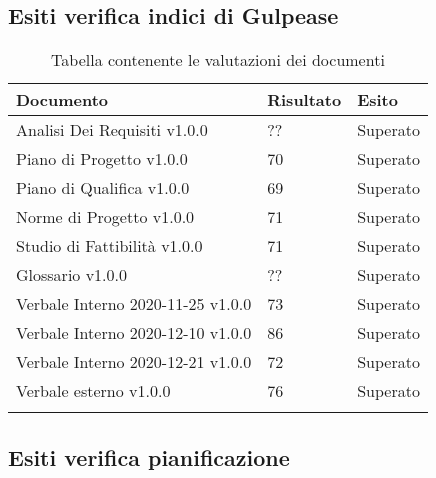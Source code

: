 \documentclass[../piano_di_qualifica.tex]{subfiles}
\begin{document}
\subsection{Esiti verifica indici di Gulpease}
\label{sub:verif_gul}

\begin{center}
	\begin{longtable}{|p{4.5cm}|p{2.5cm}|p{3cm}|}
		\hline
		\rowcolor{lightgray}
            \textbf{Documento} & \textbf{Risultato} &  \textbf{Esito} \\
            \hline 
            Analisi Dei Requisiti v1.0.0 & ?? & Superato \\
            \hline
            \hline 
            Piano di Progetto v1.0.0 & 70 & Superato \\
            \hline 
            Piano di Qualifica v1.0.0 & 69 & Superato \\
            \hline 
            Norme di Progetto v1.0.0 & 71 & Superato \\
            \hline 
            Studio di Fattibilità v1.0.0 & 71 & Superato \\
            \hline 
            Glossario v1.0.0 & ?? & Superato \\
            \hline 
            Verbale Interno 2020-11-25 v1.0.0 & 73 & Superato \\
            \hline 
            Verbale Interno 2020-12-10 v1.0.0 & 86 & Superato \\
            \hline 
            Verbale Interno 2020-12-21 v1.0.0 & 72 & Superato \\
            \hline 
            Verbale esterno v1.0.0 & 76 & Superato \\
            \hline
            \hline

\caption{Tabella contenente le valutazioni dei documenti}
\end{longtable}
\end{center}

\subsection{Esiti verifica pianificazione}
\label{sub:verif_pianif}
\end{document}

